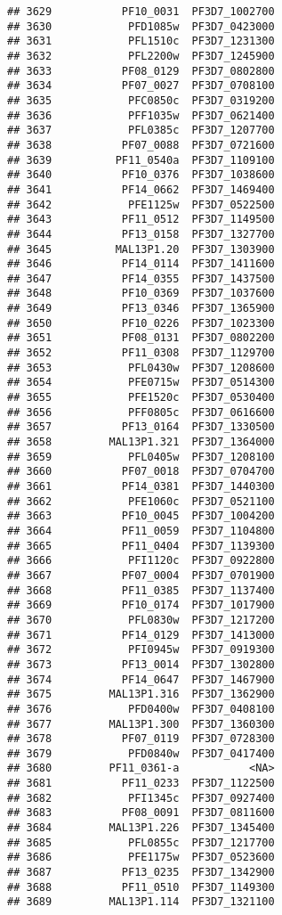 \documentclass[12pt, a4paper]{article}\usepackage[]{graphicx}\usepackage[]{color}
\makeatletter
\newenvironment{kframe}{%
 \def\at@end@of@kframe{}%
 \ifinner\ifhmode%
  \def\at@end@of@kframe{\end{minipage}}%
  \begin{minipage}{\columnwidth}%
 \fi\fi%
 \def\FrameCommand##1{\hskip\@totalleftmargin \hskip-\fboxsep
 \colorbox{shadecolor}{##1}\hskip-\fboxsep
     \hskip-\linewidth \hskip-\@totalleftmargin \hskip\columnwidth}%
 \MakeFramed {\advance\hsize-\width
   \@totalleftmargin\z@ \linewidth\hsize
   \@setminipage}}%
 {\par\unskip\endMakeFramed%
 \at@end@of@kframe}
\newenvironment{knitrout}{}{} %
\makeatother
\begin{document}
\begin{knitrout}
\begin{kframe}
\begin{verbatim}
## 3629           PF10_0031  PF3D7_1002700
## 3630            PFD1085w  PF3D7_0423000
## 3631            PFL1510c  PF3D7_1231300
## 3632            PFL2200w  PF3D7_1245900
## 3633           PF08_0129  PF3D7_0802800
## 3634           PF07_0027  PF3D7_0708100
## 3635            PFC0850c  PF3D7_0319200
## 3636            PFF1035w  PF3D7_0621400
## 3637            PFL0385c  PF3D7_1207700
## 3638           PF07_0088  PF3D7_0721600
## 3639          PF11_0540a  PF3D7_1109100
## 3640           PF10_0376  PF3D7_1038600
## 3641           PF14_0662  PF3D7_1469400
## 3642            PFE1125w  PF3D7_0522500
## 3643           PF11_0512  PF3D7_1149500
## 3644           PF13_0158  PF3D7_1327700
## 3645          MAL13P1.20  PF3D7_1303900
## 3646           PF14_0114  PF3D7_1411600
## 3647           PF14_0355  PF3D7_1437500
## 3648           PF10_0369  PF3D7_1037600
## 3649           PF13_0346  PF3D7_1365900
## 3650           PF10_0226  PF3D7_1023300
## 3651           PF08_0131  PF3D7_0802200
## 3652           PF11_0308  PF3D7_1129700
## 3653            PFL0430w  PF3D7_1208600
## 3654            PFE0715w  PF3D7_0514300
## 3655            PFE1520c  PF3D7_0530400
## 3656            PFF0805c  PF3D7_0616600
## 3657           PF13_0164  PF3D7_1330500
## 3658         MAL13P1.321  PF3D7_1364000
## 3659            PFL0405w  PF3D7_1208100
## 3660           PF07_0018  PF3D7_0704700
## 3661           PF14_0381  PF3D7_1440300
## 3662            PFE1060c  PF3D7_0521100
## 3663           PF10_0045  PF3D7_1004200
## 3664           PF11_0059  PF3D7_1104800
## 3665           PF11_0404  PF3D7_1139300
## 3666            PFI1120c  PF3D7_0922800
## 3667           PF07_0004  PF3D7_0701900
## 3668           PF11_0385  PF3D7_1137400
## 3669           PF10_0174  PF3D7_1017900
## 3670            PFL0830w  PF3D7_1217200
## 3671           PF14_0129  PF3D7_1413000
## 3672            PFI0945w  PF3D7_0919300
## 3673           PF13_0014  PF3D7_1302800
## 3674           PF14_0647  PF3D7_1467900
## 3675         MAL13P1.316  PF3D7_1362900
## 3676            PFD0400w  PF3D7_0408100
## 3677         MAL13P1.300  PF3D7_1360300
## 3678           PF07_0119  PF3D7_0728300
## 3679            PFD0840w  PF3D7_0417400
## 3680         PF11_0361-a           <NA>
## 3681           PF11_0233  PF3D7_1122500
## 3682            PFI1345c  PF3D7_0927400
## 3683           PF08_0091  PF3D7_0811600
## 3684         MAL13P1.226  PF3D7_1345400
## 3685            PFL0855c  PF3D7_1217700
## 3686            PFE1175w  PF3D7_0523600
## 3687           PF13_0235  PF3D7_1342900
## 3688           PF11_0510  PF3D7_1149300
## 3689         MAL13P1.114  PF3D7_1321100

\end{verbatim}
\end{kframe}
\end{knitrout}
\end{document}
